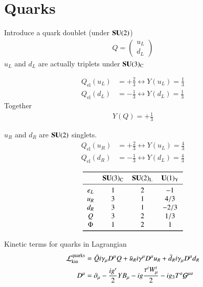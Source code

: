 \chapter{Quarks}
Introduce a quark doublet (under $\mathbf{SU}(2)$)
\begin{align}
   Q = \begin{pmatrix} u_L \\ d_L \end{pmatrix}
\end{align}
$u_L$ and $d_L$ are actually triplets under $\mathbf{SU}(3)_\text{C}$

\begin{align*}
   Q_\text{el}(u_L) &= + \frac{2}{3}  \leftrightarrow  Y(u_L)  = \frac{1}{3} \\
   Q_\text{el}(d_L) &= - \frac{1}{3}  \leftrightarrow Y(d_L)  = \frac{1}{3}
\end{align*}
Together
\begin{align}
   Y(Q) = + \frac{1}{3}
\end{align}

$u_R$ and $d_R$ are $\mathbf{SU}(2)$ singlets.
\begin{align*}
   Q_\text{el}(u_R) &= + \frac{2}{3}  \leftrightarrow  Y(u_L) = \frac{4}{3} \\
   Q_\text{el}(d_R) &= - \frac{1}{3}  \leftrightarrow Y(d_L) = \frac{4}{3}
\end{align*}

\begin{align*}
 \begin{tabular}{cccc}
   \toprule
& $\SU(3)_\text{C}$ & $\SU(2)_\text{L}$ & $\Uni(1)_\text{Y}$ \\
\midrule
   $e_L$ &  $1$ & $2$ & $-1$ \\
$u_R$ & $3$ & $1$ & $4/3$ \\
$d_R$ & $3$ & $1$ & $-2/3$ \\
$Q$ & $3$ & $2$ & $1/3$ \\
$\Phi$ & $1$ & $2$ & $1$ \\
\bottomrule
\end{tabular}
\end{align*}

Kinetic terms for quarks in Lagrangian 
\begin{align}
   \mathcal{L}_\text{kin}^\text{quarks} &= \bar{Q} i \gamma_\mu D^\mu Q + \bar{u}_R i \gamma^\mu D^\mu u_R + \bar{d}_R i \gamma_\mu D^\mu d_R \\
   D^\mu &= \partial_\mu - \frac{ig'}{2}YB_\mu - ig \frac{\tau^i W_\mu^i}{2} - ig_3 T^a \mathcal{G}^{\mu a}
\end{align}

